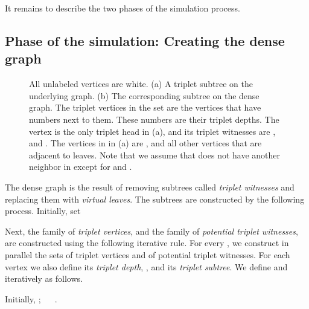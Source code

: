 \documentclass[11pt]{article}
\theoremstyle{definition}
\begin{document}
It remains to describe the two phases of the simulation process.

\subsection{Phase  of the simulation: Creating the dense graph}
\label{sub:dense_graph}

\begin{figure}[thbp]
  \caption{\sf All unlabeled vertices are white.
	      (a) A triplet subtree on the underlying graph. 
	      (b) The corresponding subtree on the dense graph. The triplet vertices in the set  are the vertices that have numbers next to them. These numbers are their triplet depths.
	      The vertex  is the only triplet head in (a), and its triplet witnesses are ,  and .
	      The vertices in  in (a) are ,  and all other vertices that are adjacent to leaves.
	      Note that we assume that  does not have another neighbor in  except for  and .
	     }
  \medskip
  \centering
  \label{fig:t1_vertex}
\end{figure}

The dense graph is the result of removing subtrees called \emph{triplet witnesses} and replacing them with \emph{virtual leaves}.
The subtrees are constructed by the following process. 
Initially, set 


Next,
the family  of \emph{triplet vertices}, 
and the family  of \emph{potential triplet witnesses},
are constructed using the following iterative rule.
For every , 
we construct in parallel the sets  of triplet vertices and  of potential triplet witnesses.
For each vertex  we also define its \emph{triplet depth}, , and its \emph{triplet subtree}.
We define  and  iteratively as follows.
\bigskip
\par\noindent
Initially,
; ~~
.
\end{document}
